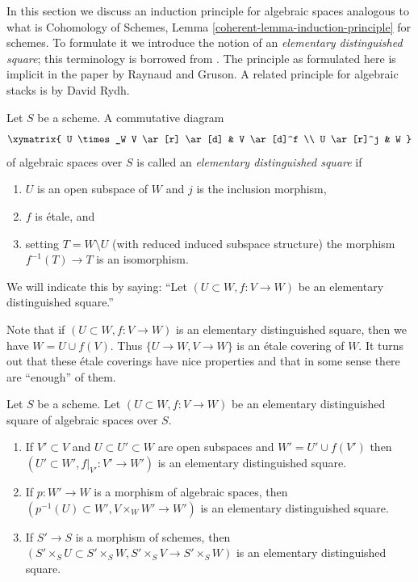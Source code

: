 \noindent
In this section we discuss an induction principle for algebraic spaces
analogous to what is
Cohomology of Schemes, Lemma \ref{coherent-lemma-induction-principle}
for schemes. To formulate it we introduce the notion of an
{\it elementary distinguished square}; this terminology is borrowed
from \cite{MV}.
The principle as formulated here is implicit in the paper \cite{GruRay}
by Raynaud and Gruson.
A related principle for algebraic stacks is
\cite[Theorem D]{rydh_etale_devissage} by David Rydh.

\begin{definition}
\label{definition-elementary-distinguished-square}
Let $S$ be a scheme. A commutative diagram
$$
\xymatrix{
U \times_W V \ar[r] \ar[d] & V \ar[d]^f \\
U \ar[r]^j & W
}
$$
of algebraic spaces over $S$ is called an {\it elementary distinguished square}
if
\begin{enumerate}
\item $U$ is an open subspace of $W$ and $j$ is the inclusion morphism,
\item $f$ is \'etale, and
\item setting $T = W \setminus U$ (with reduced induced
subspace structure) the morphism $f^{-1}(T) \to T$ is an isomorphism.
\end{enumerate}
We will indicate this by saying: ``Let $(U \subset W, f : V \to W)$
be an elementary distinguished square.''
\end{definition}

\noindent
Note that if $(U \subset W, f : V \to W)$ is an elementary distinguished
square, then we have $W = U \cup f(V)$. Thus $\{U \to W, V \to W\}$ is
an \'etale covering of $W$. It turns out that these \'etale coverings
have nice properties and that in some sense
there are ``enough'' of them.

\begin{lemma}
\label{lemma-make-more-elementary-distinguished-squares}
Let $S$ be a scheme. Let $(U \subset W, f : V \to W)$ be an elementary
distinguished square of algebraic spaces over $S$.
\begin{enumerate}
\item If $V' \subset V$ and
$U \subset U' \subset W$ are open subspaces and $W' = U' \cup f(V')$
then $(U' \subset W', f|_{V'} : V' \to W')$ is an elementary distinguished
square.
\item If $p : W' \to W$ is a morphism of algebraic spaces, then
$(p^{-1}(U) \subset W', V \times_W W' \to W')$ is an elementary distinguished
square.
\item If $S' \to S$ is a morphism of schemes, then
$(S' \times_S U \subset S' \times_S W, S' \times_S V \to S' \times_S W)$
is an elementary distinguished square.
\end{enumerate}
\end{lemma}

